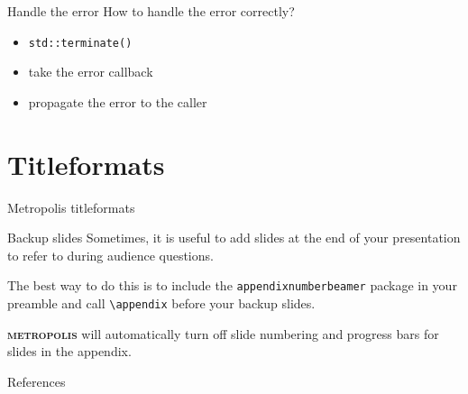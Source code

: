 \documentclass[10pt]{beamer}
\newcommand{\themename}{\textbf{\textsc{metropolis}}\xspace}
\begin{document}
\begin{frame}{Handle the error}
	How to handle the error correctly?
	
	\pause
	
	\begin{itemize}[<+- | alert@+>]
		\item \texttt{std::terminate()}
		\item take the error callback
		\item propagate the error to the caller
	\end{itemize}
	
\end{frame}



\section{Titleformats}

\begin{frame}{Metropolis titleformats}
\end{frame}


\appendix

\begin{frame}[fragile]{Backup slides}
  Sometimes, it is useful to add slides at the end of your presentation to
  refer to during audience questions.

  The best way to do this is to include the \verb|appendixnumberbeamer|
  package in your preamble and call \verb|\appendix| before your backup slides.

  \themename will automatically turn off slide numbering and progress bars for
  slides in the appendix.
\end{frame}

\begin{frame}[allowframebreaks]{References}

  
  

\end{frame}
\end{document}
